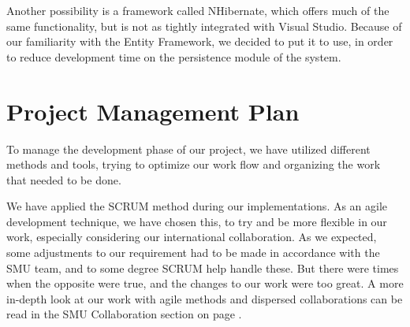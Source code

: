Another possibility is a framework called NHibernate, which offers much of the same functionality, but is not as tightly integrated with Visual Studio. Because of our familiarity with the Entity Framework, we decided to put it to use, in order to reduce development time on the persistence module of the system.

\section{Project Management Plan}
To manage the development phase of our project, we have utilized different methods and tools, trying to optimize our work flow and organizing the work that needed to be done. \

We have applied the SCRUM method during our implementations. As an agile development technique, we have chosen this, to try and be more flexible in our work, especially considering our international collaboration. As we expected, some adjustments to our requirement had to be made in accordance with the SMU team, and to some degree SCRUM help handle these. But there were times when the opposite were true, and the changes to our work were too great. A more in-depth look at our work with agile methods and dispersed collaborations can be read in the SMU Collaboration section on page \pageref{SMU Collaboration}.
